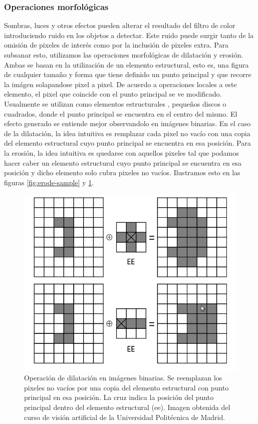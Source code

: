 	\subsubsection{Operaciones morfológicas}
Sombras, luces y otros efectos pueden alterar el resultado del filtro de color introduciendo ruido en los objetos a detectar. Este ruido puede surgir tanto de la omisión de pixeles de interés como por la inclusión de pixeles extra. Para subsanar esto, utilizamos las operaciones morfológicas de dilatación y erosión. Ambas se basan en la utilización de un elemento estructural, esto es, una figura de cualquier tamaño y forma que tiene definido un punto principal y que recorre la imágen solapandose pixel a pixel. De acuerdo a operaciones locales a este elemento, el pixel que coincide con el punto principal se ve modificado. Usualmente se utilizan como elementos estructurales , pequeños discos o cuadrados, donde el punto principal se encuentra en el centro del mismo. El efecto generado se entiende mejor observandolo en imágenes binarias. En el caso de la dilatación, la idea intuitiva es remplazar cada pixel no vacío con una copia del elemento estructural cuyo punto principal se encuentra en esa posición. Para la erosión, la idea intuitiva es quedarse con aquellos pixeles tal que podamos hacer caber un elemento estructural cuyo punto principal se encuentra en esa posición y dicho elemento solo cubra pixeles no vacíos.
Ilustramos esto en las figuras \ref{fig:erode-sample} y \ref{fig:dilate-sample}.


\begin{figure}[tpb]
\begin{center}
  \includegraphics[scale=0.4]{figuras/dilate-sample.png}
\end{center}
  \caption{\small Operación de dilatación en imágenes binarias. Se reemplazan los pixeles no vacíos por una copia del elemento estructural con punto principal en esa posición. La cruz indica la posición del punto principal dentro del elemento estructural (ee). Imagen obtenida del curso de visión artificial de la Universidad Politécnica de Madrid.}
  \label{fig:dilate-sample}
\end{figure}

